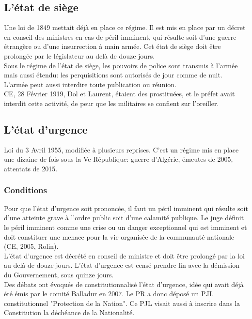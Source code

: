 \documentclass[10pt, a4paper, openany]{book}
\begin{document}
\subsection{L'état de siège}

Une loi de 1849 mettait déjà en place ce régime. Il est mis en place par un décret en conseil des ministres en cas de péril imminent, qui résulte soit d'une guerre étrangère ou d'une insurrection à main armée. Cet état de siège doit être prolongée par le législateur au delà de douze jours. \\
Sous le régime de l'état de siège, les pouvoirs de police sont transmis à l'armée mais aussi étendu: les perquisitions sont autorisés de jour comme de nuit. L'armée peut aussi interdire toute publication ou réunion. \\
CE, 28 Février 1919, Dol et Laurent, étaient des prostituées, et le préfet avait interdit cette activité, de peur que les militaires se confient sur l'oreiller.

\subsection{L'état d'urgence}

Loi du 3 Avril 1955, modifiée à plusieurs reprises. C'est un régime mis en place une dizaine de fois sous la Ve République: guerre d'Algérie, émeutes de 2005, attentats de 2015. 

\subsubsection{Conditions}

Pour que l'état d'urgence soit prononcée, il faut un péril imminent qui résulte soit d'une atteinte grave à l'ordre public soit d'une calamité publique. Le juge définit le péril imminent comme une crise ou un danger exceptionnel qui est imminent et doit constituer une menace pour la vie organisée de la communauté nationale (CE, 2005, Rolin). \\
L'état d'urgence est décrété en conseil de ministre et doit être prolongé par la loi au delà de douze jours. L'état d'urgence est censé prendre fin avec la démission du Gouvernement, sous quinze jours. \\
Des débats ont évoqués de constitutionnalisé l'état d'urgence, idée qui avait déjà été émis par le comité Balladur en 2007. Le PR a donc déposé un PJL constitutionnel "Protection de la Nation". Ce PJL visait aussi à inscrire dans la Constitution la déchéance de la Nationalité. 
\end{document}

